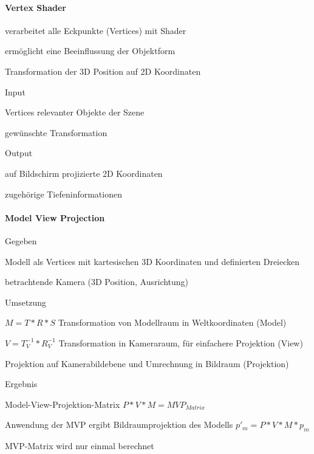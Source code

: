 \documentclass[landscape]{article}
\begin{document}
\begin{multicols}{3}
  \paragraph{Vertex Shader}
  \begin{itemize*}
    \item verarbeitet alle Eckpunkte (Vertices) mit Shader
    \item ermöglicht eine Beeinflussung der Objektform
    \item Transformation der 3D Position auf 2D Koordinaten
    \item Input
          \begin{itemize*}
            \item Vertices relevanter Objekte der Szene
            \item gewünschte Transformation
          \end{itemize*}
    \item Output
          \begin{itemize*}
            \item auf Bildschirm projizierte 2D Koordinaten
            \item zugehörige Tiefeninformationen
          \end{itemize*}
  \end{itemize*}
  
  \paragraph{Model View Projection}
  \begin{itemize*}
    \item Gegeben
          \begin{itemize*}
            \item Modell als Vertices mit kartesischen 3D Koordinaten und definierten Dreiecken
            \item betrachtende Kamera (3D Position, Ausrichtung)
          \end{itemize*}
    \item Umsetzung
          \begin{enumerate*}
            \item $M=T*R*S$ Transformation von Modellraum in Weltkoordinaten (Model)
            \item $V=T_V^{-1}*R_V^{-1}$ Transformation in Kameraraum, für einfachere Projektion (View)
            \item Projektion auf Kamerabildebene und Umrechnung in Bildraum (Projektion)
          \end{enumerate*}
    \item Ergebnis
          \begin{itemize*}
            \item Model-View-Projektion-Matrix $P*V*M=MVP_{Matrix}$
            \item Anwendung der MVP ergibt Bildraumprojektion des Modells $p'_m=P*V*M*p_m$
            \item MVP-Matrix wird nur einmal berechnet
          \end{itemize*}
  \end{itemize*}
  

\end{multicols}
\end{document}
